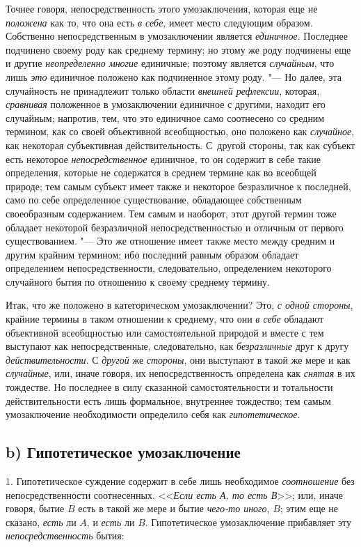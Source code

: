 {{Точнее говоря, непосредственность этого умозаключения, которая
еще не {\em положена} как
то, что она есть {\em в себе},
имеет место следующим образом. Собственно непосредственным в
умозаключении является {\em единичное}.
Последнее подчинено своему роду как среднему термину; но
этому же роду подчинены еще и другие
{\em неопределенно многие}
единичные; поэтому является
{\em случайным}, что лишь
{\em это} единичное
положено как подчиненное этому роду. "--- Но далее, эта
случайность не принадлежит только области
{\em внешней рефлексии},
которая, {\em сравнивая}
положенное в умозаключении единичное с другими, находит его
случайным; напротив, тем, что это единичное само соотнесено со средним
термином, как со своей объективной всеобщностью, оно положено как
{\em случайное}, как
некоторая субъективная действительность. С~другой стороны, так как субъект
есть некоторое {\em непосредственное}
единичное, то он содержит в себе такие определения, которые
не содержатся в среднем термине как во всеобщей природе; тем самым субъект
имеет также и некоторое безразличное к последней, само по себе определенное
существование, обладающее собственным своеобразным
содержанием. Тем самым и наоборот, этот другой
термин
тоже обладает некоторой безразличной непосредственностью и
отличным от первого существованием. "--- Это же отношение имеет
также место между средним и другим крайним термином; ибо последний равным
образом обладает определением непосредственности, следовательно,
определением некоторого случайного бытия по отношению к своему среднему
термину.

Итак, что же положено в категорическом умозаключении? Это,
{\em с одной стороны},
крайние термины в таком отношении к среднему, что они
{\em в себе} обладают
объективной всеобщностью или самостоятельной природой и вместе с тем
выступают как непосредственные, следовательно, как
{\em безразличные} друг к
другу {\em действительности}.
С {\em другой}
же {\em стороны},
они выступают в такой же мере и как
{\em случайные}, или,
иначе говоря, их непосредственность определена как
{\em снятая} в их
тождестве. Но последнее в силу сказанной самостоятельности и тотальности
действительности есть лишь формальное, внутреннее тождество; тем самым
умозаключение необходимости определило себя как
{\em гипотетическое}.

\subsection[b) Гипотетическое умозаключение]{b) Гипотетическое умозаключение}
1. Гипотетическое суждение содержит в себе лишь необходимое
{\em соотношение} без непосредственности соотнесенных.
<<{\em Если есть А, то есть В}>>; или, иначе говоря, бытие $B$ есть в такой же
мере и бытие {\em чего-то иного}, $B$; этим еще не сказано, {\em есть} ли
$A$, и {\em есть} ли $B$. Гипотетическое умозаключение прибавляет эту
{\em непосредственность} бытия:

}}
